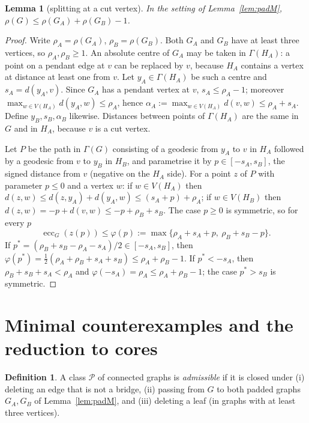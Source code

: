 \documentclass[11pt]{amsart}
\newtheorem{lemma}[theorem]{Lemma}
\theoremstyle{definition}
\newtheorem{definition}[theorem]{Definition}
\newcommand{\ecc}{\operatorname{ecc}}
\begin{document}
\begin{lemma}[splitting at a cut vertex]\label{lem:split}
In the setting of Lemma~\ref{lem:padM}, $\rho(G)\le\rho(G_A)+\rho(G_B)-1$.
\end{lemma}
\begin{proof}
Write $\rho_A=\rho(G_A)$, $\rho_B=\rho(G_B)$. Both $G_A$ and $G_B$ have at least three vertices, so
$\rho_A,\rho_B\ge1$. An absolute centre of $G_A$ may be taken in $\Gamma(H_A)$: a point on a pendant
edge at $v$ can be replaced by $v$, because $H_A$ contains a vertex at distance at least one from $v$.
Let $y_A\in\Gamma(H_A)$ be such a centre and $s_A=d(y_A,v)$. Since $G_A$ has a pendant vertex at $v$,
$s_A\le\rho_A-1$; moreover $\max_{w\in V(H_A)}d(y_A,w)\le\rho_A$, hence
$\alpha_A:=\max_{w\in V(H_A)}d(v,w)\le\rho_A+s_A$. Define $y_B,s_B,\alpha_B$ likewise. Distances
between points of $\Gamma(H_A)$ are the same in $G$ and in $H_A$, because $v$ is a cut vertex.

Let $P$ be the path in $\Gamma(G)$ consisting of a geodesic from $y_A$ to $v$ in $H_A$ followed by a
geodesic from $v$ to $y_B$ in $H_B$, and parametrise it by $p\in[-s_A,s_B]$, the signed distance from
$v$ (negative on the $H_A$ side). For a point $z$ of $P$ with parameter $p\le 0$ and a vertex $w$:
if $w\in V(H_A)$ then $d(z,w)\le d(z,y_A)+d(y_A,w)\le (s_A+p)+\rho_A$; if $w\in V(H_B)$ then
$d(z,w)=-p+d(v,w)\le -p+\rho_B+s_B$. The case $p\ge0$ is symmetric, so for every $p$
\[
 \ecc_G(z(p))\le \varphi(p):=\max\{\rho_A+s_A+p,\ \rho_B+s_B-p\}.
\]
If $p^*=(\rho_B+s_B-\rho_A-s_A)/2\in[-s_A,s_B]$, then
$\varphi(p^*)=\frac12(\rho_A+\rho_B+s_A+s_B)\le\rho_A+\rho_B-1$. If $p^*<-s_A$, then
$\rho_B+s_B+s_A<\rho_A$ and $\varphi(-s_A)=\rho_A\le\rho_A+\rho_B-1$; the case $p^*>s_B$ is
symmetric.
\end{proof}

\section{Minimal counterexamples and the reduction to cores}\label{sec:mincex}

\begin{definition}\label{def:admissible}
A class $\mathcal P$ of connected graphs is \emph{admissible} if it is closed under
(i) deleting an edge that is not a bridge, (ii) passing from $G$ to both padded graphs $G_A,G_B$ of
Lemma~\ref{lem:padM}, and (iii) deleting a leaf (in graphs with at least three vertices).
\end{definition}
\end{document}
